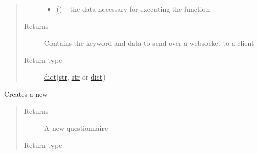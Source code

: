 \documentclass[letterpaper,10pt,english]{sphinxmanual}
\begin{document}
\begin{fulllineitems}
\begin{fulllineitems}
\begin{quote}
\begin{description}
\begin{itemize}
\item {} 
 (\href{https://docs.python.org/2/library/stdtypes.html\#dict}{}\sphinxstyleliteralemphasis{(}\href{https://docs.python.org/2/library/functions.html\#str}{}\sphinxstyleliteralemphasis{, }\href{https://docs.python.org/2/library/functions.html\#str}{}\href{https://docs.python.org/2/library/stdtypes.html\#dict}{}\sphinxstyleliteralemphasis{)}\sphinxstyleliteralemphasis{}) -- the data necessary for executing the function

\end{itemize}

\item[{Returns}] \leavevmode
Contains the keyword and data to send over a websocket to a client

\item[{Return type}] \leavevmode
\href{https://docs.python.org/2/library/stdtypes.html\#dict}{dict}(\href{https://docs.python.org/2/library/functions.html\#str}{str}, \href{https://docs.python.org/2/library/functions.html\#str}{str} or \href{https://docs.python.org/2/library/stdtypes.html\#dict}{dict})

\end{description}\end{quote}

\end{fulllineitems}


\begin{fulllineitems}
\label{\detokenize{consumer:consumer.Consumer.create_questionnaire}}
Creates a new {\hyperref[\detokenize{questionnaire:questionnaire.Questionnaire}]{}}
\begin{quote}\begin{description}
\item[{Returns}] \leavevmode
A new questionnaire

\item[{Return type}] \leavevmode
{\hyperref[\detokenize{questionnaire:questionnaire.Questionnaire}]{}}

\end{description}\end{quote}


\end{fulllineitems}
\end{fulllineitems}
\end{document}
